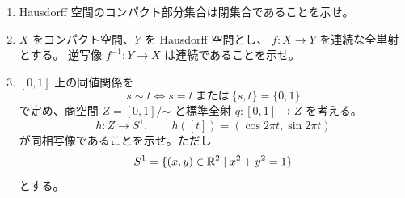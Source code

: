 
\begin{enumerate}
  \item Hausdorff 空間のコンパクト部分集合は閉集合であることを示せ。
  \item \(X\) をコンパクト空間、\(Y\) を Hausdorff 空間とし、
  \(f:X\to Y\) を連続な全単射とする。
  逆写像 \(f^{-1}:Y\to X\) は連続であることを示せ。
  \item \([0,1]\) 上の同値関係を
  \[
  s\sim t
  \iff
  s=t\ \text{または}\ \{s,t\}=\{0,1\}
  \]
  で定め、商空間 \(Z=[0,1]/\mathord{\sim}\) と標準全射
  \(q:[0,1]\to Z\) を考える。
  \[
  h:Z\to S^1,
  \qquad
  h([t])=(\cos 2\pi t,\sin 2\pi t)
  \]
  が同相写像であることを示せ。ただし
  \[
  S^1=\{(x,y)\in\mathbb R^2\mid x^2+y^2=1\}
  \]
  とする。
\end{enumerate}




